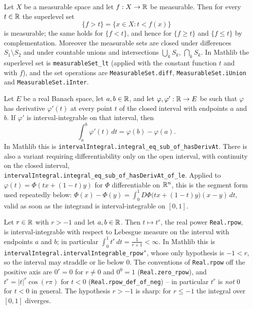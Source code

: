 \begin{proposition}
Let $X$ be a measurable space and let $f:X\to\mathbb{R}$ be measurable.  Then for every
$t\in\mathbb{R}$ the superlevel set
\[
\{f>t\}=\{x\in X: t<f(x)\}
\]
is measurable; the same holds for $\{f<t\}$, and hence for $\{f\ge t\}$ and
$\{f\le t\}$ by complementation.  Moreover the measurable sets are closed under
differences $S_1\setminus S_2$ and under countable unions and intersections
$\bigcup_{k}S_k$, $\bigcap_{k}S_k$.  In Mathlib the superlevel set is
\texttt{measurableSet\_lt} (applied with the constant function $t$ and with
$f$), and the set operations are \texttt{MeasurableSet.diff},
\texttt{MeasurableSet.iUnion} and \texttt{MeasurableSet.iInter}.
\end{proposition}

\begin{proposition}
Let $E$ be a real Banach space, let $a,b\in\mathbb{R}$, and let
$\varphi,\varphi':\mathbb{R}\to E$ be such that $\varphi$ has derivative $\varphi'(t)$
at every point $t$ of the closed interval with endpoints $a$ and $b$.  If
$\varphi'$ is interval-integrable on that interval, then
\[
\int_a^b\varphi'(t)\,dt=\varphi(b)-\varphi(a) .
\]
In Mathlib this is
\texttt{intervalIntegral.integral\_eq\_sub\_of\_hasDerivAt}.  There is also a
variant requiring differentiability only on the open interval, with continuity
on the closed interval,
\texttt{intervalIntegral.integral\_eq\_sub\_of\_hasDerivAt\_of\_le}.  Applied to
$\varphi(t)=\Phi(tx+(1-t)y)$ for $\Phi$ differentiable on $\mathbb{R}^n$, this is the
segment form used repeatedly below: $\Phi(x)-\Phi(y)=\int_0^1
D\Phi\bigl(tx+(1-t)y\bigr)(x-y)\,dt$, valid as soon as the integrand is
interval-integrable on $[0,1]$.
\end{proposition}

\begin{proposition}
Let $r\in\mathbb{R}$ with $r>-1$ and let $a,b\in\mathbb{R}$.  Then $t\mapsto t^{r}$, the real
power \texttt{Real.rpow}, is interval-integrable with respect to Lebesgue
measure on the interval with endpoints $a$ and $b$; in particular $\int_0^1t^{r}\,dt=\frac1{r+1}<\infty$.
In Mathlib this is \texttt{intervalIntegral.intervalIntegrable\_rpow'}, whose
only hypothesis is $-1<r$, so the interval may straddle or lie below $0$.  The
conventions of \texttt{Real.rpow} off the positive axis are $0^{r}=0$ for
$r\ne0$ and $0^{0}=1$ (\texttt{Real.zero\_rpow}), and
$t^{r}=|t|^{r}\cos(r\pi)$ for $t<0$ (\texttt{Real.rpow\_def\_of\_neg}) -- in
particular $t^{r}$ is \emph{not} $0$ for $t<0$ in general.  The hypothesis
$r>-1$ is sharp: for $r\le-1$ the integral over $[0,1]$ diverges.
\end{proposition}

